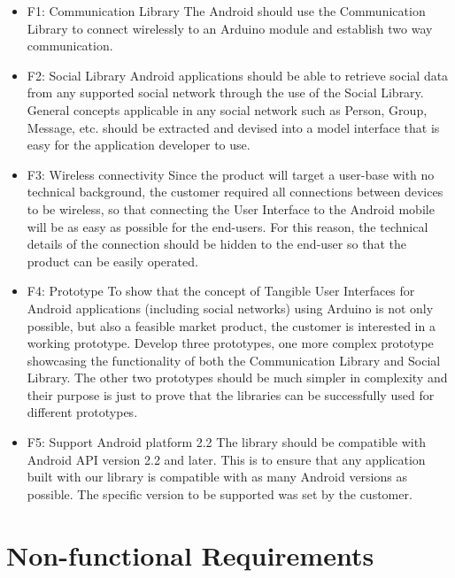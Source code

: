 \begin{itemize}
\item{F1: Communication Library}\newline
The Android should use the Communication Library to connect wirelessly 
to an Arduino module and establish two way communication.

\item{F2: Social Library}\newline
Android applications should be able to retrieve social data from any 
supported social network through the use of the Social Library. General 
concepts applicable in any social network such as Person, Group, Message, etc.
should be extracted and devised into a model interface that is easy for the application
developer to use.

\item{F3: Wireless connectivity}\newline
Since the product will target a user-base with no technical background,
the customer required all connections between devices to be wireless,
so that connecting the User Interface to the Android mobile will be
as easy as possible for the end-users. For this reason, the technical
details of the connection should be hidden to the end-user so that
the product can be easily operated.
	
\item{F4: Prototype}\newline
To show that the concept of Tangible User Interfaces for Android applications
(including social networks) using Arduino is not only possible, but
also a feasible market product, the customer is interested in a working
prototype. Develop three prototypes, one more complex prototype showcasing the 
functionality of both the Communication Library and Social Library. The other
two prototypes should be much simpler in complexity and their purpose is just to
prove that the libraries can be successfully used for different prototypes.

\item{F5: Support Android platform 2.2}\newline
The library should be compatible with Android API version 2.2 and later. This is to
ensure that any application built with our library is compatible with as many Android
versions as possible. The specific version to be supported was set by the customer.
\end{itemize}


\section{Non-functional Requirements}

